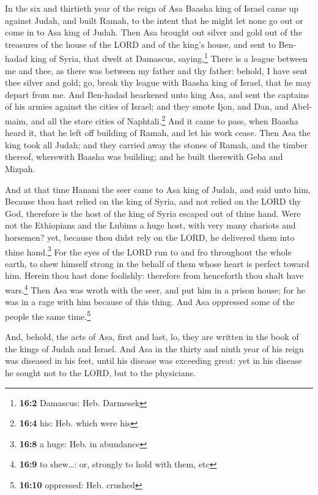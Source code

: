  In the six and thirtieth year of the reign of Asa Baasha
king of Israel came up against Judah, and built Ramah, to the intent
that he might let none go out or come in to Asa king of Judah.
 Then Asa brought out silver and gold out of the treasures
of the house of the LORD and of the king's house, and sent to Ben-hadad
king of Syria, that dwelt at Damascus, saying,\footnote{\textbf{16:2}
  Damascus: Heb. Darmesek}  There is a league between me
and thee, as there was between my father and thy father: behold, I have
sent thee silver and gold; go, break thy league with Baasha king of
Israel, that he may depart from me.  And Ben-hadad
hearkened unto king Asa, and sent the captains of his armies against the
cities of Israel; and they smote Ijon, and Dan, and Abel-maim, and all
the store cities of Naphtali.\footnote{\textbf{16:4} his: Heb. which
  were his}  And it came to pass, when Baasha heard it,
that he left off building of Ramah, and let his work cease.
 Then Asa the king took all Judah; and they carried away
the stones of Ramah, and the timber thereof, wherewith Baasha was
building; and he built therewith Geba and Mizpah.

 And at that time Hanani the seer came to Asa king of
Judah, and said unto him, Because thou hast relied on the king of Syria,
and not relied on the LORD thy God, therefore is the host of the king of
Syria escaped out of thine hand.  Were not the Ethiopians
and the Lubims a huge host, with very many chariots and horsemen? yet,
because thou didst rely on the LORD, he delivered them into thine
hand.\footnote{\textbf{16:8} a huge: Heb. in abundance} 
For the eyes of the LORD run to and fro throughout the whole earth, to
shew himself strong in the behalf of them whose heart is perfect toward
him. Herein thou hast done foolishly: therefore from henceforth thou
shalt have wars.\footnote{\textbf{16:9} to shew\ldots: or, strongly to
  hold with them, etc}  Then Asa was wroth with the seer,
and put him in a prison house; for he was in a rage with him because of
this thing. And Asa oppressed some of the people the same
time.\footnote{\textbf{16:10} oppressed: Heb. crushed}

 And, behold, the acts of Asa, first and last, lo, they
are written in the book of the kings of Judah and Israel.
 And Asa in the thirty and ninth year of his reign was
diseased in his feet, until his disease was exceeding great: yet in his
disease he sought not to the LORD, but to the physicians.

